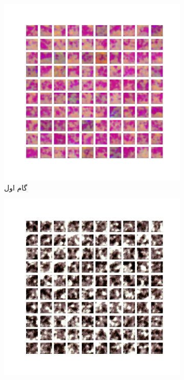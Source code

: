 \documentclass[12pt, a4paper]{book}
\begin{document}
\begin{figure}[h]
    \begin{subfigure}{0.3\linewidth}
        \includegraphics[width=\linewidth]{images/dcgan/nlayer2/generated_img_01.png}
        \caption{گام اول}
    \end{subfigure}
    \begin{subfigure}{0.3\linewidth}
        \includegraphics[width=\linewidth]{images/dcgan/nlayer2/generated_img_15.png}

\end{subfigure}
\end{figure}
\end{document}
